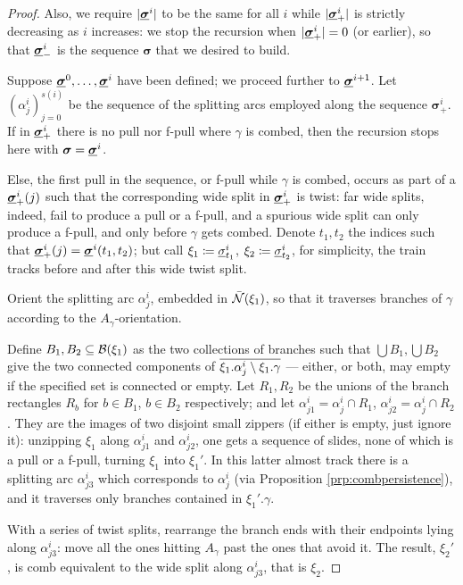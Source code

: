 \begin{proof}
Also, we require $|\underline{\bm\sigma}^i|$ to be the same for all $i$ while $|\underline{\bm\sigma}^i_+|$ is strictly decreasing as $i$ increases: we stop the recursion when $|\underline{\bm\sigma}^i_+|=0$ (or earlier), so that $\underline{\bm\sigma}^i_-$ is the sequence $\bm\sigma$ that we desired to build. 

Suppose $\underline{\bm\sigma}^0,\ldots, \underline{\bm\sigma}^i$ have been defined; we proceed further to $\underline{\bm\sigma}^{i+1}$. Let $(\alpha^i_j)_{j=0}^{s(i)}$ be the sequence of the splitting arcs employed along the sequence $\bm\sigma^i_+$. If in $\underline{\bm\sigma}^i_+$ there is no pull nor f-pull where $\gamma$ is combed, then the recursion stops here with $\bm\sigma=\underline{\bm\sigma}^i$.

Else, the first pull in the sequence, or f-pull while $\gamma$ is combed, occurs as part of a $\underline{\bm\sigma}^i_+(j)$ such that the corresponding wide split in $\underline{\bm\sigma}^i_+$ is twist: far wide splits, indeed, fail to produce a pull or a f-pull, and a spurious wide split can only produce a f-pull, and only before $\gamma$ gets combed. Denote $t_1,t_2$ the indices such that $\underline{\bm\sigma}^i_+(j)=\underline{\bm\sigma}^i(t_1,t_2)$; but call $\xi_1\coloneqq \underline{\sigma}^i_{t_1}$, $\xi_2\coloneqq \underline{\sigma}^i_{t_2}$, for simplicity, the train tracks before and after this wide twist split.

Orient the splitting arc $\alpha^i_j$, embedded in $\bar{{\mathcal N}}(\xi_1)$, so that it traverses branches of $\gamma$ according to the $A_\gamma$-orientation. 

Define $B_1,B_2\subseteq \mathcal B(\xi_1)$ as the two collections of branches such that $\bigcup B_1,\bigcup B_2$ give the two connected components of $\overline{\xi_1.\alpha^i_j\setminus\xi_1.\gamma}$ --- either, or both, may empty if the specified set is connected or empty. Let $R_1,R_2$ be the unions of the branch rectangles $R_b$ for $b\in B_1$, $b\in B_2$ respectively; and let $\alpha^i_{j1}=\alpha^i_j\cap R_1$, $\alpha^i_{j2}=\alpha^i_j\cap R_2$. They are the images of two disjoint small zippers (if either is empty, just ignore it): unzipping $\xi_1$ along $\alpha^i_{j1}$ and $\alpha^i_{j2}$, one gets a sequence of slides, none of which is a pull or a f-pull, turning $\xi_1$ into $\xi_1'$. In this latter almost track there is a splitting arc $\alpha^i_{j3}$ which corresponds to $\alpha^i_j$ (via Proposition \ref{prp:combpersistence}), and it traverses only branches contained in $\xi_1'.\gamma$.

With a series of twist splits, rearrange the branch ends with their endpoints lying along $\alpha^i_{j3}$: move all the ones hitting $A_\gamma$ past the ones that avoid it. The result, $\xi_2'$, is comb equivalent to the wide split along $\alpha^i_{j3}$, that is $\xi_2$.


\end{proof}
